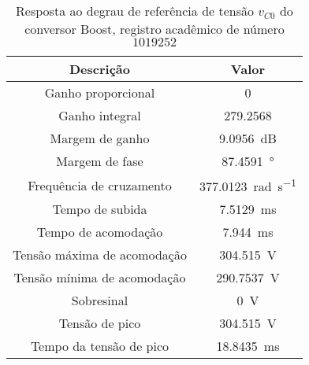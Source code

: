 \begin{table}[!ht]
\centering
\caption{Resposta ao degrau de referência de tensão $v_{C0}$ do conversor Boost, registro acadêmico de número $1019252$}
\label{tab:resposta1malha}
\begin{tabular}{@{}cc@{}}
\toprule
\textbf{Descrição} & \textbf{Valor}\\ \midrule
Ganho proporcional & \SI{0}{}\\
Ganho integral & \SI{279.2568}{}\\
Margem de ganho & \SI{9.0956}{\deci\bel}\\
Margem de fase & \SI{87.4591}{\degree}\\
Frequência de cruzamento & \SI{377.0123}{\radian\per\s}\\
Tempo de subida & \SI{7.5129}{\milli\s}\\
Tempo de acomodação & \SI{7.944}{\milli\s}\\
Tensão máxima de acomodação & \SI{304.515}{\V}\\
Tensão mínima de acomodação & \SI{290.7537}{\V}\\
Sobresinal & \SI{0}{\V}\\
Tensão de pico & \SI{304.515}{\V}\\
Tempo da tensão de pico & \SI{18.8435}{\milli\s}\\
\bottomrule
\end{tabular}
\end{table}

